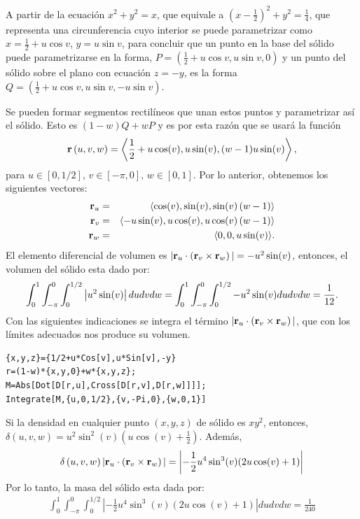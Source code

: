 A partir de la ecuación $x^{2}+y^{2}=x$, que equivale a
$\left( x-\frac{1}{2}\right) ^{2}+y^{2}=\frac{1}{4}$, que representa una circunferencia cuyo interior se puede parametrizar como $x=\frac{1}{2}+u\cos v$, $y=u\sin v$, para concluir que un punto en la base del sólido puede parametrizarse en la forma,
$P=\left( \frac{1}{2}+u\cos v,u\sin v,0\right) $ y un punto del sólido sobre el plano con ecuación $z=-y$, es la forma
$Q=\left( \frac{1}{2}+u\cos v,u\sin v,-u\sin v\right)$.

Se pueden formar segmentos rectilíneos que unan estos puntos y parame\-trizar así el sólido. Esto es $(1-w)Q+wP$ y es por esta razón que se usará la función
\[{\bf r}\left( u,v,w\right) =\left\langle \frac{1}{2}+u\cos (v) ,u\sin
(v) , (w-1)u\sin (v) \right\rangle,\]
para $u\in [0,1/2],\,v\in [-\pi,0],\,w\in [0,1]$. Por lo anterior, obtenemos los siguientes vectores:
\begin{eqnarray*}
{\bf r}_{u}&=&\langle \cos (v) ,\sin (v),\sin (v) \left( w-1\right) \rangle\\
{\bf r}_{v}&=&\langle -u\sin (v) ,u\cos (v) ,u\cos(v) \left( w-1\right) \rangle\\
{\bf r}_{w}&=& \langle 0,0,u\sin (v) \rangle.
\end{eqnarray*}
El elemento diferencial de volumen es
$| {\bf r}_{u}\cdot \left( {\bf r}_{v}\times {\bf r}_{w}\right)| =-u^{2}\sin (v) $,
entonces, el volumen del sólido esta dado por:
\begin{gather*}
\displaystyle \int_{0}^{1}\displaystyle \int_{-\pi }^{0}\displaystyle \int_{0}^{1/2}\left| u^{2}\sin (v)
\right| dudvdw = \int_{0}^{1}\displaystyle \int_{-\pi }^{0} \int_{0}^{1/2} -u^{2}\sin (v)dudvdw=\frac{1}{12}.
\end{gather*}
Con las siguientes indicaciones se integra el término
$|{\bf r}_{u}\cdot \left( {\bf r}_{v}\times {\bf r}_{w}\right)|$, que con los límites adecuados nos produce su volumen.

\begin{tcolorbox}[title=\bf Instrucción en \verb"Mathematica"]\begin{Verbatim}[formatcom=\letraverbatim]
{x,y,z}={1/2+u*Cos[v],u*Sin[v],-y}
r=(1-w)*{x,y,0}+w*{x,y,z};
M=Abs[Dot[D[r,u],Cross[D[r,v],D[r,w]]]];
Integrate[M,{u,0,1/2},{v,-Pi,0},{w,0,1}]
\end{Verbatim}
\end{tcolorbox}

\begin{tcolorbox}
Si la densidad en cualquier punto $(x,y,z)$ de sólido es $xy^{2}$,
entonces, $\delta \left( u,v,w\right) =u^2 \sin ^2(v) \left(u \cos (v)+\frac{1}{2}\right)$. Además,
\begin{gather*}
  \delta \left( u,v,w\right) | {\bf r}_{u}\cdot \left( {\bf r}_{v}\times {\bf r}_{w}\right)|=\left|-\frac{1}{2}u^4\sin^3(v)(2u\cos(v)+1)\right|
\end{gather*}
Por lo tanto, la masa del sólido esta dada por:
\begin{gather*}
  \int_{0}^{1}\int_{-\pi }^{0}\int_{0}^{1/2}\left|-\frac{1}{2}u^4\sin^3(v)(2u\cos(v)+1)\right| dudvdw=\frac{1}{240}
\end{gather*}
\end{tcolorbox}

